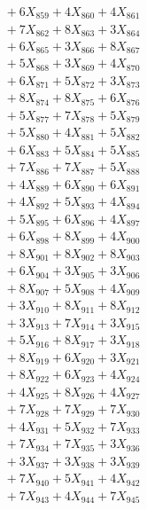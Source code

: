 \documentclass[a4paper,10pt]{article}
\begin{document}
{\begin{align}
&\;  + 6 X_{859} + 4 X_{860} + 4 X_{861} \\[0.3ex]
&\;  + 7 X_{862} + 8 X_{863} + 3 X_{864} \\[0.3ex]
&\;  + 6 X_{865} + 3 X_{866} + 8 X_{867} \\[0.3ex]
&\;  + 5 X_{868} + 3 X_{869} + 4 X_{870} \\[0.3ex]
&\;  + 6 X_{871} + 5 X_{872} + 3 X_{873} \\[0.3ex]
&\;  + 8 X_{874} + 8 X_{875} + 6 X_{876} \\[0.3ex]
&\;  + 5 X_{877} + 7 X_{878} + 5 X_{879} \\[0.5ex]\allowbreak
&\;  + 5 X_{880} + 4 X_{881} + 5 X_{882} \\[0.3ex]
&\;  + 6 X_{883} + 5 X_{884} + 5 X_{885} \\[0.3ex]
&\;  + 7 X_{886} + 7 X_{887} + 5 X_{888} \\[0.3ex]
&\;  + 4 X_{889} + 6 X_{890} + 6 X_{891} \\[0.3ex]
&\;  + 4 X_{892} + 5 X_{893} + 4 X_{894} \\[0.3ex]
&\;  + 5 X_{895} + 6 X_{896} + 4 X_{897} \\[0.3ex]
&\;  + 6 X_{898} + 8 X_{899} + 4 X_{900} \\[0.3ex]
&\;  + 8 X_{901} + 8 X_{902} + 8 X_{903} \\[0.3ex]
&\;  + 6 X_{904} + 3 X_{905} + 3 X_{906} \\[0.3ex]
&\;  + 8 X_{907} + 5 X_{908} + 4 X_{909} \\[0.5ex]\allowbreak
&\;  + 3 X_{910} + 8 X_{911} + 8 X_{912} \\[0.3ex]
&\;  + 3 X_{913} + 7 X_{914} + 3 X_{915} \\[0.3ex]
&\;  + 5 X_{916} + 8 X_{917} + 3 X_{918} \\[0.3ex]
&\;  + 8 X_{919} + 6 X_{920} + 3 X_{921} \\[0.3ex]
&\;  + 8 X_{922} + 6 X_{923} + 4 X_{924} \\[0.3ex]
&\;  + 4 X_{925} + 8 X_{926} + 4 X_{927} \\[0.3ex]
&\;  + 7 X_{928} + 7 X_{929} + 7 X_{930} \\[0.3ex]
&\;  + 4 X_{931} + 5 X_{932} + 7 X_{933} \\[0.3ex]
&\;  + 7 X_{934} + 7 X_{935} + 3 X_{936} \\[0.3ex]
&\;  + 3 X_{937} + 3 X_{938} + 3 X_{939} \\[0.5ex]\allowbreak
&\;  + 7 X_{940} + 5 X_{941} + 4 X_{942} \\[0.3ex]
&\;  + 7 X_{943} + 4 X_{944} + 7 X_{945} \\[0.3ex]

\end{align}}
\end{document}
